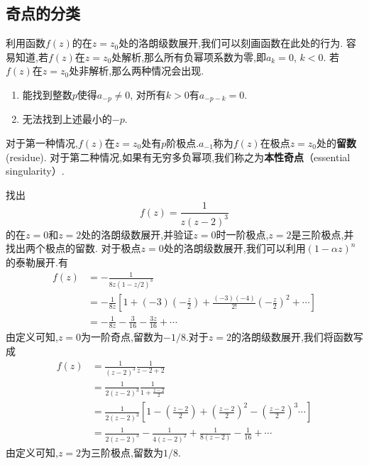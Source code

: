 \subsection{奇点的分类}
\label{subsec:singular_points}
利用函数$f(z)$的在$z=z_0$处的洛朗级数展开,我们可以刻画函数在此处的行为.
容易知道,若$f(z)$在$z=z_0$处解析,那么所有负幂项系数为零,即$a_k = 0$, $k<0$.
若$f(z)$在$z=z_0$处非解析,那么两种情况会出现.
\begin{enumerate}
    \item 能找到整数$p$使得$a_{-p} \neq 0$, 对所有$k>0$有$a_{-p - k}=0$.
    \item 无法找到上述最小的$-p$.
\end{enumerate}
对于第一种情况,$f(z)$在$z=z_0$处有$p$阶极点.$a_{-1}$称为$f(z)$在极点$z=z_0$处的\textbf{留数}(residue).
对于第二种情况,如果有无穷多负幂项,我们称之为\textbf{本性奇点}（essential singularity）.

\begin{examplebox}{找出\[f(z) = \frac{1}{z( z- 2)^3}\]
    的在$z=0$和$z=2$处的洛朗级数展开,并验证$z=0$时一阶极点,$z=2$是三阶极点,并找出两个极点的留数.}
对于极点$z=0$处的洛朗级数展开,我们可以利用$(1-\alpha z)^n$的泰勒展开.有
\[
    \begin{aligned}
    f(z) &= -\frac{1}{8z(1-z/2)^3}
    \\
     &= -\frac{1}{8z}\left[ 1 + (-3) (-\frac{z}{2}) + \frac{(-3)(-4)}{2!} \left( -\frac{z}{2}\right)^2 + \cdots \right] 
    \\
     &= -\frac{1}{8z} - \frac{3}{16} - \frac{3z}{16} + \cdots   
    \end{aligned}
\]
由定义可知,$z=0$为一阶奇点,留数为$-1/8$.对于$z=2$的洛朗级数展开,我们将函数写成
\[
    \begin{aligned}
        f(z) &= \frac{1}{(z-2)^3} \frac{1}{z-2 + 2}
        \\
        &= \frac{1}{2(z-2)^3} \frac{1}{1+\frac{z-2}{2}}
        \\
        &= \frac{1}{2(z-2)^3} \left[ 1 - \left(\frac{z-2}{2} \right) + \left(\frac{z-2}{2}\right)^2 - \left(\frac{z-2}{2}\right)^3 \cdots \right] 
        \\
        &= \frac{1}{2(z-2)^3} - \frac{1}{4(z-2)^2} + \frac{1}{8(z-2)} - \frac{1}{16} + \cdots
    \end{aligned}
\]
由定义可知,$z=2$为三阶极点,留数为$1/8$.
\end{examplebox}

